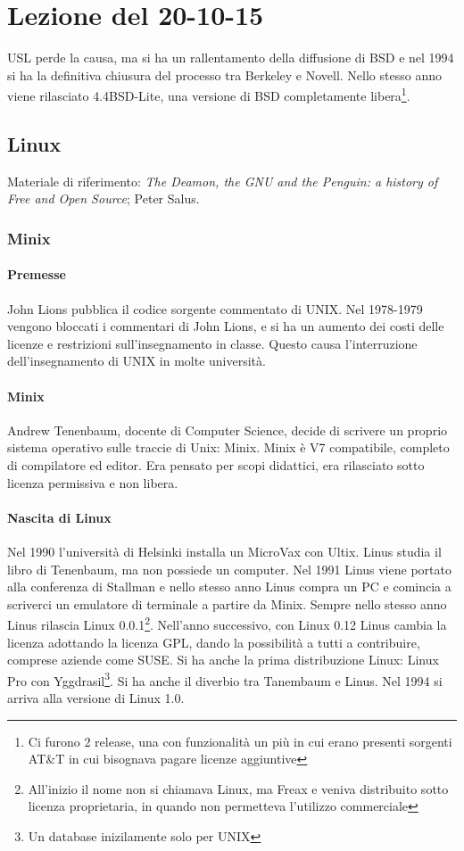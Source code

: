 \section{Lezione del 20-10-15}

USL perde la causa, ma si ha un rallentamento della diffusione di BSD e nel 1994 si ha la definitiva chiusura del processo tra Berkeley e Novell. Nello stesso anno viene rilasciato 4.4BSD-Lite, una versione di BSD completamente libera\footnote{Ci furono 2 release, una con funzionalit\`a un pi\`u in cui erano presenti sorgenti AT\&T in cui bisognava pagare licenze aggiuntive}.

\subsection{Linux}

Materiale di riferimento: \textit{The Deamon, the GNU and the Penguin: a history of Free and Open Source}; Peter Salus.

\subsubsection{Minix}

\paragraph*{Premesse} John Lions pubblica il codice sorgente commentato di UNIX. Nel 1978-1979 vengono bloccati i commentari di John Lions, e si ha un aumento dei costi delle licenze e restrizioni sull'insegnamento in classe. Questo causa l'interruzione dell'insegnamento di UNIX in molte universit\`a.

\paragraph*{Minix} Andrew Tenenbaum, docente di Computer Science, decide di scrivere un proprio sistema operativo sulle traccie di Unix: Minix. Minix \`e V7 compatibile, completo di compilatore ed editor. Era pensato per scopi didattici, era rilasciato sotto licenza permissiva e non libera.

\paragraph*{Nascita di Linux} Nel 1990 l'universit\`a di Helsinki installa un MicroVax con Ultix. Linus studia il libro di Tenenbaum, ma non possiede un computer. Nel 1991 Linus viene portato alla conferenza di Stallman e nello stesso anno Linus compra un PC e comincia a scriverci un emulatore di terminale a partire da Minix. Sempre nello stesso anno Linus rilascia Linux 0.0.1\footnote{All'inizio il nome non si chiamava Linux, ma Freax e veniva distribuito sotto licenza proprietaria, in quando non permetteva l'utilizzo commerciale}. Nell'anno successivo, con Linux 0.12 Linus cambia la licenza adottando la licenza GPL, dando la possibilit\`a a tutti a contribuire, comprese aziende come SUSE. Si ha anche la prima distribuzione Linux: Linux Pro con Yggdrasil\footnote{Un database inizilamente solo per UNIX}. Si ha anche il diverbio tra Tanembaum e Linus. Nel 1994 si arriva alla versione di Linux 1.0.


